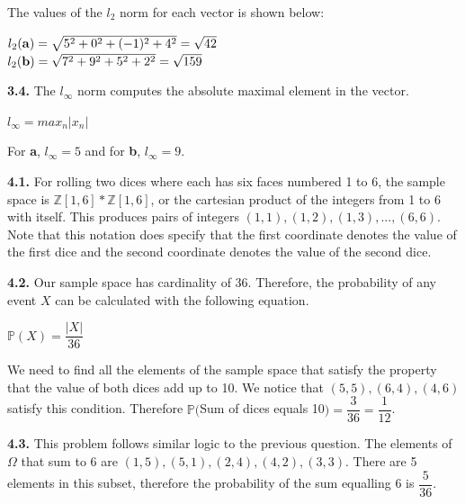 \documentclass[12pt]{article}
\begin{document}
The values of the $l_{2}$ norm for each vector is shown below:

\begin{center}

$l_{2}({\bf a})=\sqrt{5^{2}+0^{2}+(-1)^{2}+4^{2}}=\sqrt{42}$\\
\bigskip
$l_{2}({\bf b})=\sqrt{7^{2}+9^{2}+5^{2}+2^{2}}=\sqrt{159}$\\

\end{center}

{\bf 3.4.} The $l_{\infty}$ norm computes the absolute maximal element in the vector.

\begin{center}

$l_{\infty}=max_{n}|x_{n}|$\\

\end{center}

For {\bf a}, $l_{\infty}=5$ and for {\bf b}, $l_{\infty}=9$. 

{\bf 4.1.} For rolling two dices where each has six faces numbered 1 to 6, the sample space is $\mathbb{Z}[1, 6]*\mathbb{Z}[1,6]$, or the cartesian product of the integers from 1 to 6 with itself. This produces pairs of integers $(1,1), (1,2), (1,3),...,(6,6)$. Note that this notation does specify that the first coordinate denotes the value of the first dice and the second coordinate denotes the value of the second dice. 

{\bf 4.2.} Our sample space has cardinality of 36. Therefore, the probability of any event $X$ can be calculated with the following equation.

\begin{center}

$\mathbb{P}(X)=\dfrac{|X|}{36}$\\

\end{center}

We need to find all the elements of the sample space that satisfy the property that the value of both dices add up to 10. We notice that $(5,5),(6,4),(4,6)$ satisfy this condition. Therefore $\mathbb{P}($Sum of dices equals 10$)=\dfrac{3}{36}=\dfrac{1}{12}$. 

{\bf 4.3.} This problem follows similar logic to the previous question. The elements of $\Omega$ that sum to 6 are $(1,5),(5,1),(2,4),(4,2),(3,3)$. There are 5 elements in this subset, therefore the probability of the sum equalling 6 is $\dfrac{5}{36}$. 
\end{document}
